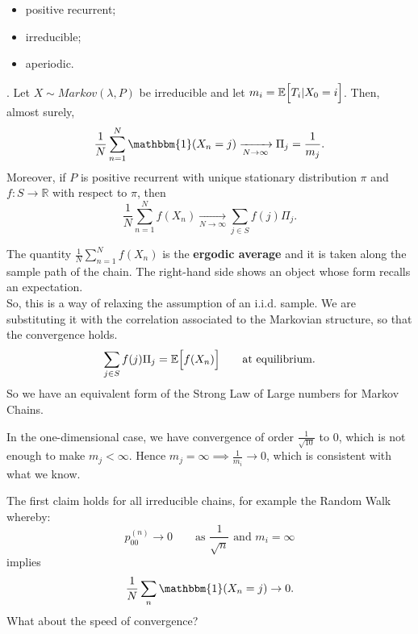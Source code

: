 \documentclass{article}
\begin{document}
	\begin{itemize}
		\item positive recurrent;
		\item irreducible;
		\item {} aperiodic.
	\end{itemize}
	\begin{theorem}
		. Let $X\sim Markov(\lambda,P)$ be irreducible and let $m_i=\mathbb{E}\Bigl[T_i|X_0=i\Bigr]$. Then, almost surely,
		\[\frac{1}{N}\sum_{n=1}^N\mathbbm{1}(X_n=j)\xrightarrow[N\rightarrow\infty]{}\Pi_j=\frac{1}{m_j}.\]
		Moreover, if $P$ is positive recurrent with unique stationary distribution $\pi$ and $f:S\rightarrow\mathbb{R}$ with respect to $\pi$, then
		\[\frac{1}{N}\sum_{n=1}^Nf(X_n)\xrightarrow[N\rightarrow\infty]{}\sum_{j\in S}f(j)\Pi_j.\]
	\end{theorem}
	The quantity $\frac{1}{N}\sum_{n=1}^Nf(X_n)$ is the \textbf{ergodic average} and it is taken along the sample path of the chain. The right-hand side shows an object whose form recalls an expectation. \\
	So, this is a way of relaxing the assumption of an i.i.d. sample. We are substituting it with the correlation associated to the Markovian structure, so that the convergence holds. 
	\[\sum_{j\in S}f(j)\Pi_j=\mathbb{E}\Bigl[{f(X_n)}\Bigr] \qquad \text{at equilibrium.}\]
	So we have an equivalent form of the Strong Law of Large numbers for Markov Chains.
	\begin{remark}
		In the one-dimensional case, we have convergence of order $\frac{1}{\sqrt{10}}$ to $0$, which is not enough to make $m_j < \infty$. Hence $m_j = \infty \implies \frac{1}{m_i} \rightarrow 0$, which is consistent with what we know.
	\end{remark}
	The first claim holds for all irreducible chains, for example the Random Walk whereby:
	\[p_{00}^{(n)}\rightarrow0 \qquad\text{as }\frac{1}{\sqrt{n}}\text{ and }m_i=\infty\]
	implies
	\[\frac{1}{N}\sum_n\mathbbm{1}(X_n=j)\rightarrow0.\]
	What about the speed of convergence?
\end{document}
